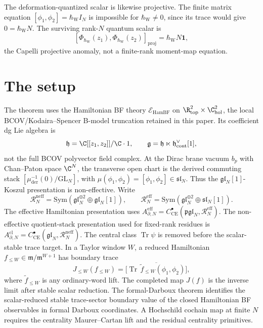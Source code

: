 \documentclass[11pt]{memoir}
\begin{document}
The deformation-quantized scalar is likewise projective.  The finite
matrix equation \([\phi_1,\phi_2]=\hbar_{\mathrm{W}} I_N\) is impossible for
\(\hbar_{\mathrm{W}}\ne0\), since its trace would give \(0=\hbar_{\mathrm{W}}N\).  The surviving
rank-\(N\) quantum scalar is
\[
  [\Phi_{\hbar_{\mathrm{W}}}(z_1),
   \Phi_{\hbar_{\mathrm{W}}}(z_2)]_{\mathrm{proj}}
  =\hbar_{\mathrm{W}}N\mathbf 1,
\]
the Capelli projective anomaly, not a finite-rank moment-map equation.

\section{The setup}\label{sec:setup}

The theorem uses the Hamiltonian BF theory
\(\mathcal E_{\mathrm{HamBF}}\) on
\(\R^2_{\mathrm{top}}\times\C^2_{\mathrm{hol}}\), the local
BCOV/Kodaira--Spencer B-model truncation retained in this paper.  Its
coefficient dg Lie algebra is
\[
  \mathfrak h=\C[[z_1,z_2]]/\C\cdot1,\qquad
  \mathfrak g=\mathfrak h\ltimes
  \mathfrak h^\vee_{\mathrm{cont}}[1],
\]
not the full BCOV polyvector field complex.  At the Dirac brane
vacuum \(b_p\) with Chan--Paton space \(\C^N\), the transverse open
chart is the derived commuting stack
\([\mu^{-1}_{\mathrm{der}}(0)/\mathrm{GL}_N]\), with
\(\mu(\phi_1,\phi_2)=[\phi_1,\phi_2]\in\mathfrak{sl}_N\).  Thus the
\(\mathfrak{gl}_N[1]\)-Koszul presentation is non-effective.  Write
  \[
    \mathcal R_N^{\mathrm{neff}}
      =
      \mathrm{Sym}(\mathfrak{gl}_N^{\oplus2}\oplus\mathfrak{gl}_N[1]),
    \qquad
    \mathcal R_N^{\mathrm{eff}}
      =
      \mathrm{Sym}(\mathfrak{gl}_N^{\oplus2}\oplus\mathfrak{sl}_N[1]).
  \]
The effective Hamiltonian presentation uses
\(A^{\mathrm{eff}}_{\partial,N}
  =C^\bullet_{\mathrm{CE}}(\mathfrak{pgl}_N,\mathcal R_N^{\mathrm{eff}})\).
The non-effective quotient-stack presentation used for fixed-rank
residues is
\(A^{\mathrm{cl}}_{\partial,N}
  =C^\bullet_{\mathrm{CE}}(\mathfrak{gl}_N,
    \mathcal R_N^{\mathrm{neff}})\).
The central class \(\operatorname{Tr}\psi\) is removed before the
scalar-stable trace target.  In a Taylor window \(W\), a
reduced Hamiltonian \(f_{\leq W}\in\mathfrak m/\mathfrak m^{W+1}\) has
boundary trace
\[
  J_{\leq W}(f_{\leq W})
  =
  \bigl[\overline{\operatorname{Tr}\,
  \tilde f_{\leq W}(\phi_1,\phi_2)}\bigr],
\]
where \(\tilde f_{\leq W}\) is any ordinary-word lift.  The completed
map \(J(f)\) is the inverse limit after stable scalar reduction.
The formal-Darboux theorem identifies the scalar-reduced stable
trace-sector boundary value of the closed Hamiltonian BF observables in
formal Darboux coordinates.  A Hochschild cochain map at finite \(N\)
requires the centrality Maurer--Cartan lift and the residual centrality
primitives.
\end{document}
